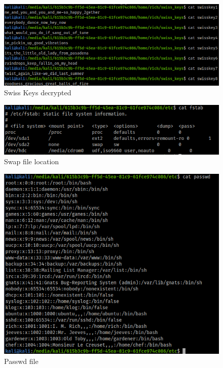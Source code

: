 \documentclass[a4paper,12pt]{article}
\begin{document}
\begin{figure}[H]
	\begin{center}
		\includegraphics[scale = 0.60]{img/act1/swisskeyDecrypted.png} 
	\end{center}
	\caption{Swiss Keys decrypted}
	\label{decrypted}
\end{figure}

\begin{figure}[H]
	\begin{center}
		\includegraphics[scale = 0.57]{img/act1/swaplocation.png} 
	\end{center}
	\caption{Swap file location}
	\label{swap}
\end{figure}

\begin{figure}[H]
	\begin{center}
		\includegraphics[scale = 0.49]{img/act1/pass.png} 
	\end{center}
	\caption{Passwd file}
	\label{pass}
\end{figure}
\end{document}
